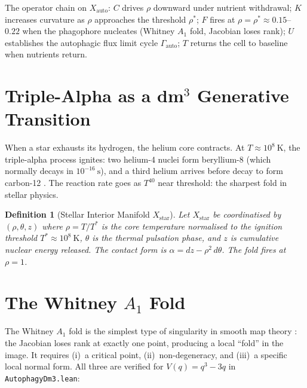\documentclass[12pt,a4paper]{article}
\newtheorem{definition}{Definition}[section]
\begin{document}
The operator chain on $X_\mathrm{auto}$: $C$ drives $\rho$ downward
under nutrient withdrawal; $K$ increases curvature as $\rho$ approaches
the threshold $\rho^*$; $F$ fires at $\rho = \rho^* \approx 0.15$--$0.22$
when the phagophore nucleates (Whitney $A_1$ fold, Jacobian loses rank);
$U$ establishes the autophagic flux limit cycle $\Gamma_\mathrm{auto}$;
$T$ returns the cell to baseline when nutrients return.

\section{Triple-Alpha as a dm$^3$ Generative Transition}
\label{sec:star}

When a star exhausts its hydrogen, the helium core contracts. At
$T \approx 10^8~\mathrm{K}$, the triple-alpha process ignites: two
helium-4 nuclei form beryllium-8 (which normally decays in
$10^{-16}~\mathrm{s}$), and a third helium arrives before decay to
form carbon-12 \cite{Salpeter1952}. The reaction rate goes as $T^{40}$
near threshold: the sharpest fold in stellar physics.

\begin{definition}[Stellar Interior Manifold $X_\mathrm{star}$]
Let $X_\mathrm{star}$ be coordinatised by $(\rho, \theta, z)$ where
$\rho = T/T^*$ is the core temperature normalised to the ignition
threshold $T^* \approx 10^8~\mathrm{K}$, $\theta$ is the thermal
pulsation phase, and $z$ is cumulative nuclear energy released.
The contact form is $\alpha = dz - \rho^2\,d\theta$.
The fold fires at $\rho = 1$.
\end{definition}

\section{The Whitney $A_1$ Fold}
\label{sec:whitney}

The Whitney $A_1$ fold is the simplest type of singularity in smooth map
theory \cite{Arnold1986}: the Jacobian loses rank at exactly one point,
producing a local ``fold'' in the image.  It requires (i)~a critical
point, (ii)~non-degeneracy, and (iii)~a specific local normal form.
All three are verified for $V(q) = q^3 - 3q$ in
\texttt{AutophagyDm3.lean}:
\end{document}
